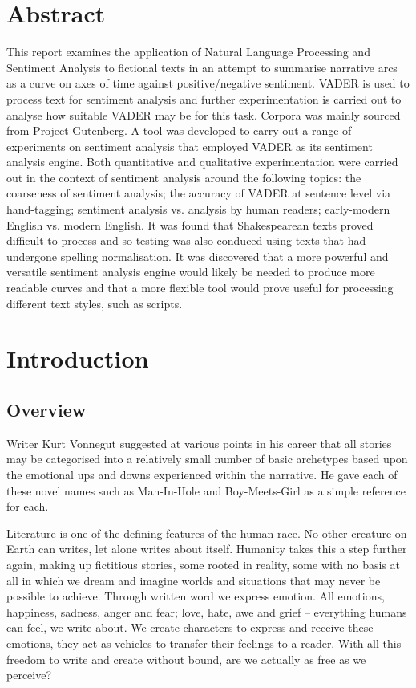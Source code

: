 \documentclass{article}
\begin{document}
\section*{Abstract}
    This report examines the application of Natural Language Processing and Sentiment Analysis to fictional texts in an attempt to summarise narrative arcs as a curve on axes of time against positive/negative sentiment. VADER is used to process text for sentiment analysis and further experimentation is carried out to analyse how suitable VADER may be for this task. Corpora was mainly sourced from Project Gutenberg. A tool was developed to carry out a range of experiments on sentiment analysis that employed VADER as its sentiment analysis engine. Both quantitative and qualitative experimentation were carried out in the context of sentiment analysis around the following topics: the coarseness of sentiment analysis; the accuracy of VADER at sentence level via hand-tagging; sentiment analysis vs. analysis by human readers; early-modern English vs. modern English. It was found that Shakespearean texts proved difficult to process and so testing was also conduced using texts that had undergone spelling normalisation. It was discovered that a more powerful and versatile sentiment analysis engine would likely be needed to produce more readable curves and that a more flexible tool would prove useful for processing different text styles, such as scripts.
\newpage
\tableofcontents
\newpage
\section{Introduction}
    \subsection{Overview}
        Writer Kurt Vonnegut suggested at various points in his career that all stories may be categorised into a relatively small number of basic archetypes based upon the emotional ups and downs experienced within the narrative. He gave each of these novel names such as Man-In-Hole and Boy-Meets-Girl as a simple reference for each. \citep{vonnegutLecture}

        Literature is one of the defining features of the human race. No other creature on Earth can writes, let alone writes about itself. Humanity takes this a step further again, making up fictitious stories, some rooted in reality, some with no basis at all in which we dream and imagine worlds and situations that may never be possible to achieve. Through written word we express emotion. All emotions, happiness, sadness, anger and fear; love, hate, awe and grief – everything humans can feel, we write about. We create characters to express and receive these emotions, they act as vehicles to transfer their feelings to a reader. With all this freedom to write and create without bound, are we actually as free as we perceive?
\end{document}
